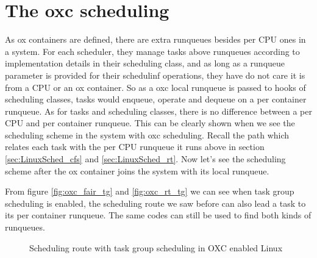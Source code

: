 \section{The oxc scheduling\label{sec:design_oxc_scheduling}}
As ox containers are defined, there are extra runqueues besides per CPU ones 
in a system. For each scheduler, they manage tasks above runqueues according
to implementation details in their scheduling class, and as long as a runqueue
parameter is provided for their schedulinf operations, they have do not care 
it is from a CPU or an ox container.
So as a oxc local runqueue is passed to hooks of scheduling classes, tasks would 
enqueue, operate and dequeue on a per container runqueue. As for tasks and scheduling
classes, there is no difference between a per CPU and per container runqueue.
This can be clearly shown when we see the scheduling scheme in the system 
with oxc scheduling. Recall the path which relates each
task with the per CPU runqueue it runs above in section \ref{sec:LinuxSched_cfs}
and \ref{sec:LinuxSched_rt}. Now let's see the scheduling scheme after the 
ox container joins the system with its local runqueue. 

From figure \ref{fig:oxc_fair_tg} and \ref{fig:oxc_rt_tg} we can see when 
task group scheduling is enabled, the scheduling route we saw before can also
lead a task to its per container runqueue. The same codes can still be used to
find both kinds of runqueues.

\begin{figure}[htbp]
\begin{center}
\end{center}
	\caption{Scheduling route with task group scheduling 
						in OXC enabled Linux}
	\label{fig:scheduling_route_oxc}
\end{figure}

